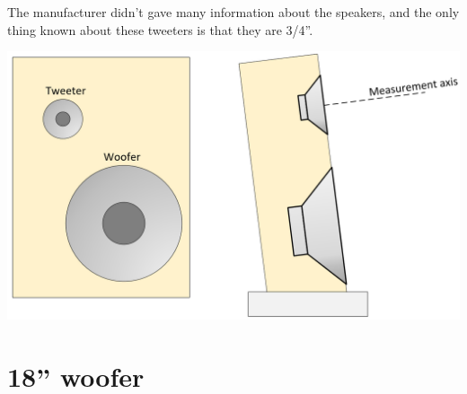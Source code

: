 \documentclass{report}
\begin{document}
\begin{appendices}
\begin{minipage}{0.6\textwidth}
The manufacturer didn't gave many information about the speakers, and the only thing known about these tweeters is that they are 3/4''.

\end{minipage}
\begin{minipage}{0.4\textwidth}
\begin{center}
	\includegraphics[scale=0.2]{Sym/Spkr_BmO}
    \captionsetup{hypcap=false}
    \label{fig:2wayDiagSpkr}
\end{center}
\end{minipage}

\section{18'' woofer}


\end{appendices}
\end{document}
